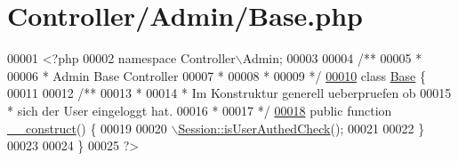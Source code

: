 \hypertarget{_controller_2_admin_2_base_8php}{\section{Controller/\-Admin/\-Base.php}
\label{_controller_2_admin_2_base_8php}
}

\begin{DoxyCode}
00001 <?php
00002 \textcolor{keyword}{namespace }Controller\(\backslash\)Admin;
00003 \textcolor{comment}{}
00004 \textcolor{comment}{/**}
00005 \textcolor{comment}{ * }
00006 \textcolor{comment}{ * Admin Base Controller}
00007 \textcolor{comment}{ * }
00008 \textcolor{comment}{ * }
00009 \textcolor{comment}{ */}
\hypertarget{_controller_2_admin_2_base_8php_source_l00010}{}\hyperlink{class_controller_1_1_admin_1_1_base}{00010} \textcolor{keyword}{class }\hyperlink{class_controller_1_1_admin_1_1_base}{Base} \{
00011         \textcolor{comment}{}
00012 \textcolor{comment}{        /** }
00013 \textcolor{comment}{         * }
00014 \textcolor{comment}{         * Im Konstruktur generell ueberpruefen ob }
00015 \textcolor{comment}{         * sich der User eingeloggt hat.}
00016 \textcolor{comment}{         * }
00017 \textcolor{comment}{         */}
\hypertarget{_controller_2_admin_2_base_8php_source_l00018}{}\hyperlink{class_controller_1_1_admin_1_1_base_a7e433734833c21c222186860f4cd8ce5}{00018}         \textcolor{keyword}{public} \textcolor{keyword}{function} \hyperlink{class_controller_1_1_admin_1_1_base_a7e433734833c21c222186860f4cd8ce5}{\_\_construct}() \{
00019                 
00020                 \hyperlink{class_session_a49f0fb7185ab07bdbf6bdff477b43ff8}{\(\backslash\)Session::isUserAuthedCheck}();
00021                 
00022         \}
00023         
00024 \}
00025 ?>
\end{DoxyCode}
